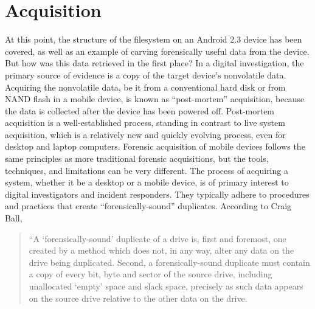 \section{Acquisition}
At this point, the structure of the filesystem on an Android 2.3 device has been covered, as well as an example of carving
forensically useful data from the device. But how was this data retrieved in the first place? In a digital investigation, the
primary source of evidence is a copy of the target device's nonvolatile data.  Acquiring the nonvolatile data, be it from a
conventional hard disk or from NAND flash in a mobile device, is known as ``post-mortem'' acquisition, because the data is
collected after the device has been powered off.  Post-mortem acquisition is a well-established process, standing in contrast to
live system acquisition, which is a relatively new and quickly evolving process, even for desktop and laptop computers.  Forensic
acquisition of mobile devices follows the same principles as more traditional forensic acquisitions, but the tools, techniques, and
limitations can be very different. The process of acquiring a system, whether it be a desktop or a mobile device, is of primary
interest to digital investigators and incident responders. They typically adhere to procedures and practices that create
``forensically-sound'' duplicates.  According to Craig Ball, 

\begin{quote}
“A ‘forensically-sound’ duplicate of a drive is, first and foremost, one created by a method which does not, in any way, alter any data on the drive being duplicated. 
Second, a forensically-sound duplicate must contain a copy of every bit, byte and sector of the source drive, including unallocated ‘empty’ space and slack space, precisely as such data appears on the source drive relative to the other data on the drive. 
\cite{ball}
\end{quote}

